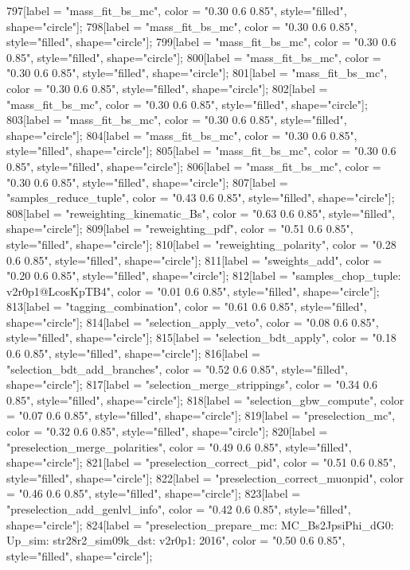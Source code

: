 {	797[label = "mass_fit_bs_mc", color = "0.30 0.6 0.85", style="filled", shape="circle"];
	798[label = "mass_fit_bs_mc", color = "0.30 0.6 0.85", style="filled", shape="circle"];
	799[label = "mass_fit_bs_mc", color = "0.30 0.6 0.85", style="filled", shape="circle"];
	800[label = "mass_fit_bs_mc", color = "0.30 0.6 0.85", style="filled", shape="circle"];
	801[label = "mass_fit_bs_mc", color = "0.30 0.6 0.85", style="filled", shape="circle"];
	802[label = "mass_fit_bs_mc", color = "0.30 0.6 0.85", style="filled", shape="circle"];
	803[label = "mass_fit_bs_mc", color = "0.30 0.6 0.85", style="filled", shape="circle"];
	804[label = "mass_fit_bs_mc", color = "0.30 0.6 0.85", style="filled", shape="circle"];
	805[label = "mass_fit_bs_mc", color = "0.30 0.6 0.85", style="filled", shape="circle"];
	806[label = "mass_fit_bs_mc", color = "0.30 0.6 0.85", style="filled", shape="circle"];
	807[label = "samples_reduce_tuple", color = "0.43 0.6 0.85", style="filled", shape="circle"];
	808[label = "reweighting_kinematic_Bs", color = "0.63 0.6 0.85", style="filled", shape="circle"];
	809[label = "reweighting_pdf", color = "0.51 0.6 0.85", style="filled", shape="circle"];
	810[label = "reweighting_polarity", color = "0.28 0.6 0.85", style="filled", shape="circle"];
	811[label = "sweights_add", color = "0.20 0.6 0.85", style="filled", shape="circle"];
	812[label = "samples_chop_tuple\nversion: v2r0p1@LcosKpTB4", color = "0.01 0.6 0.85", style="filled", shape="circle"];
	813[label = "tagging_combination", color = "0.61 0.6 0.85", style="filled", shape="circle"];
	814[label = "selection_apply_veto", color = "0.08 0.6 0.85", style="filled", shape="circle"];
	815[label = "selection_bdt_apply", color = "0.18 0.6 0.85", style="filled", shape="circle"];
	816[label = "selection_bdt_add_branches", color = "0.52 0.6 0.85", style="filled", shape="circle"];
	817[label = "selection_merge_strippings", color = "0.34 0.6 0.85", style="filled", shape="circle"];
	818[label = "selection_gbw_compute", color = "0.07 0.6 0.85", style="filled", shape="circle"];
	819[label = "preselection_mc", color = "0.32 0.6 0.85", style="filled", shape="circle"];
	820[label = "preselection_merge_polarities", color = "0.49 0.6 0.85", style="filled", shape="circle"];
	821[label = "preselection_correct_pid", color = "0.51 0.6 0.85", style="filled", shape="circle"];
	822[label = "preselection_correct_muonpid", color = "0.46 0.6 0.85", style="filled", shape="circle"];
	823[label = "preselection_add_genlvl_info", color = "0.42 0.6 0.85", style="filled", shape="circle"];
	824[label = "preselection_prepare_mc\nmode: MC_Bs2JpsiPhi_dG0\npolarity: Up\nstrip_sim: str28r2_sim09k_dst\nversion: v2r0p1\nyear: 2016", color = "0.50 0.6 0.85", style="filled", shape="circle"];
}
